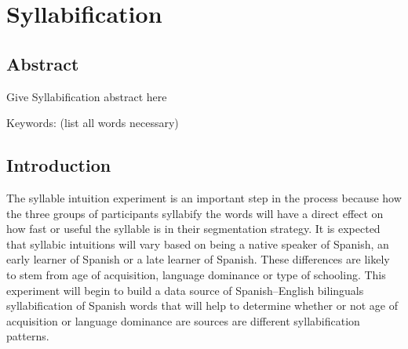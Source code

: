 
\chapter{Syllabification} %

\label{Chapter2} %


\section{Abstract}

Give Syllabification abstract here

Keywords: (list all words necessary)


\section{Introduction}


The syllable intuition experiment is an important step in the process because how the three groups of participants syllabify the words will have a direct effect on how fast or useful the syllable is in their segmentation strategy. It is expected that syllabic intuitions will vary based on being a native speaker of Spanish, an early learner of Spanish or a late learner of Spanish. These differences are likely to stem from age of acquisition, language dominance or type of schooling. This experiment will begin to build a data source of Spanish–English bilinguals syllabification of Spanish words that will help to determine whether or not age of acquisition or language dominance are sources are different syllabification patterns. 



